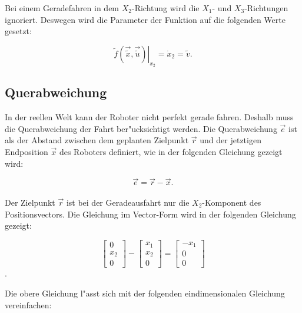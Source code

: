 Bei einem Geradefahren in dem \(X_2\)-Richtung wird die \(X_1\)- und \(X_3\)-Richtungen ignoriert. Deswegen wird die Parameter der Funktion auf die folgenden Werte gesetzt:


\begin{equation}
    \left. \widetilde{f}(\overrightarrow{\widetilde{x}}, \overrightarrow{\widetilde{u}})\right\rvert_{x_2} = \dot{x}_2 = \widetilde{v}.
\end{equation}

\subsection{Querabweichung}

In der reellen Welt kann der Roboter nicht perfekt gerade fahren. Deshalb muss die Querabweichung der Fahrt ber"ucksichtigt werden. Die Querabweichung \(\overrightarrow{e}\) ist als der Abstand zwischen dem geplanten Zielpunkt \(\overrightarrow{r}\) und der jetztigen Endposition \(\overrightarrow{x}\) des Roboters definiert, wie in der folgenden Gleichung gezeigt wird:

\begin{equation*}
    \overrightarrow{e} = \overrightarrow{r} - \overrightarrow{x}.
\end{equation*} \\

Der Zielpunkt \(\overrightarrow{r}\) ist bei der Geradeausfahrt nur die \(X_2\)-Komponent des Positionsvectors.  Die Gleichung im Vector-Form wird in der folgenden Gleichung gezeigt:

\begin{equation*}
    \begin{bmatrix}
        0 \\
        x_2 \\
        0
    \end{bmatrix}
    -
    \begin{bmatrix}
        x_1 \\
        x_2 \\
        0
    \end{bmatrix}
    =
    \begin{bmatrix}
        -x_1 \\
        0 \\
        0
    \end{bmatrix}
\end{equation*}.

Die obere Gleichung l"asst sich mit der folgenden eindimensionalen Gleichung vereinfachen:

